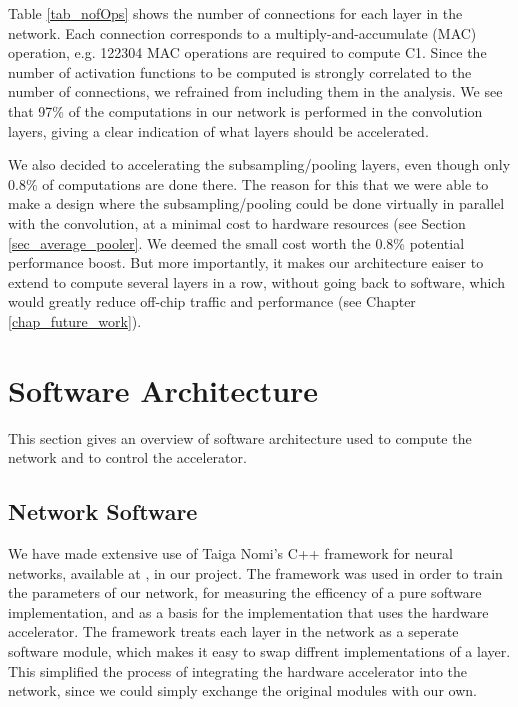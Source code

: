 Table \ref{tab_nofOps} shows the number of connections for each layer in the network. Each connection corresponds to a multiply-and-accumulate (MAC) operation, e.g. 122304 MAC operations are required to compute C1. Since the number of activation functions to be computed is strongly correlated to the number of connections, we refrained from including them in the analysis. 
We see that 97\% of the computations in our network is performed in the convolution layers, giving a clear indication of what layers should be accelerated. 

We also decided to accelerating the subsampling/pooling layers, even though only 0.8\% of computations are done there. The reason for this that we were able to make a design where the subsampling/pooling could be done virtually in parallel with the convolution, at a minimal cost to hardware resources (see Section \ref{sec_average_pooler}. We deemed the small cost worth the 0.8\% potential performance boost. But more importantly, it makes our architecture eaiser to extend to compute several layers in a row, without going back to software, which would greatly reduce off-chip traffic and performance (see Chapter \ref{chap_future_work}).


\section{Software Architecture}

This section gives an overview of software architecture used to compute the network and to control the accelerator.

\subsection{Network Software}

We have made extensive use of Taiga Nomi's C++ framework for neural networks, available at \cite{Nomi2015}, in our project. The framework was used in order to train the parameters of our network, for measuring the efficency of a pure software implementation, and as a basis for the implementation that uses the hardware accelerator. The framework treats each layer in the network as a seperate software module, which makes it easy to swap diffrent implementations of a layer. This simplified the process of integrating the hardware accelerator into the network, since we could simply exchange the original modules with our own.

